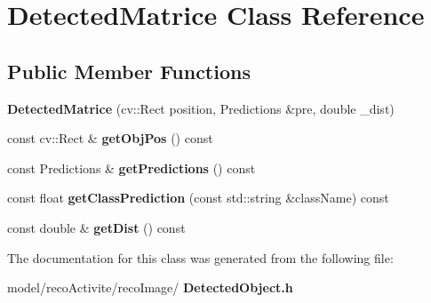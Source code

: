\section{Detected\+Matrice Class Reference}
\label{class_detected_matrice}
\subsection*{Public Member Functions}
\begin{DoxyCompactItemize}
\item 
\mbox{\label{class_detected_matrice_af524c8a91c61e074871d33ed102e2961}} 
{\bfseries Detected\+Matrice} (cv\+::\+Rect position, Predictions \&pre, double \+\_\+dist)
\item 
\mbox{\label{class_detected_matrice_af30ec5c5e2ade42dbb6cf6456cf7e18a}} 
const cv\+::\+Rect \& {\bfseries get\+Obj\+Pos} () const
\item 
\mbox{\label{class_detected_matrice_a5e31961c1ddef7e5c07bcabe30ddfb0e}} 
const Predictions \& {\bfseries get\+Predictions} () const
\item 
\mbox{\label{class_detected_matrice_ad53cda7581f0bb7a1e5b1adce9e540fa}} 
const float {\bfseries get\+Class\+Prediction} (const std\+::string \&class\+Name) const
\item 
\mbox{\label{class_detected_matrice_a225c1388ee3f92420fd21efd09ad7a53}} 
const double \& {\bfseries get\+Dist} () const
\end{DoxyCompactItemize}


The documentation for this class was generated from the following file\+:\begin{DoxyCompactItemize}
\item 
model/reco\+Activite/reco\+Image/\textbf{ Detected\+Object.\+h}\end{DoxyCompactItemize}

